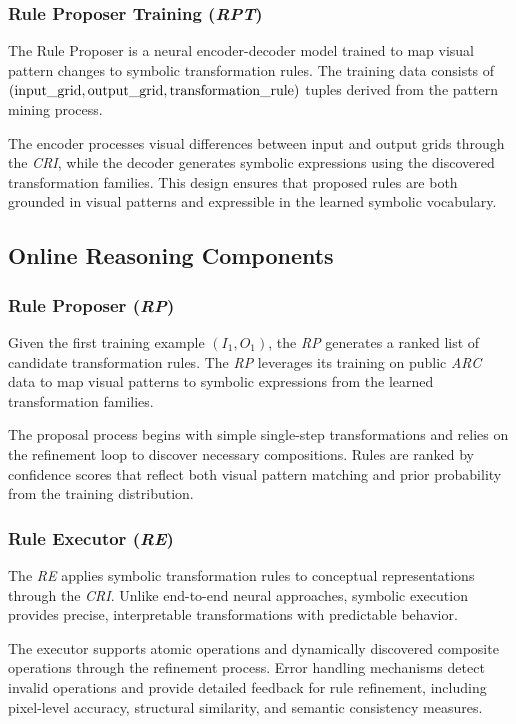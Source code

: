\documentclass[12pt]{article}
\newcommand{\arc}{\textit{ARC}}
\newcommand{\rpt}{\textit{RPT}}
\newcommand{\rp}{\textit{RP}}
\newcommand{\re}{\textit{RE}}
\newcommand{\cri}{\textit{CRI}}
\begin{document}
\subsubsection{Rule Proposer Training (\rpt{})}

The Rule Proposer is a neural encoder-decoder model trained to map visual pattern changes to symbolic transformation rules. The training data consists of $(\text{input\_grid}, \text{output\_grid},\\ \text{transformation\_rule})$ tuples derived from the pattern mining process.

The encoder processes visual differences between input and output grids through the \cri{}, while the decoder generates symbolic expressions using the discovered transformation families. This design ensures that proposed rules are both grounded in visual patterns and expressible in the learned symbolic vocabulary.

\subsection{Online Reasoning Components}

\subsubsection{Rule Proposer (\rp{})}

Given the first training example $(I_1, O_1)$, the \rp{} generates a ranked list of candidate transformation rules. The \rp{} leverages its training on public \arc{} data to map visual patterns to symbolic expressions from the learned transformation families.

The proposal process begins with simple single-step transformations and relies on the refinement loop to discover necessary compositions. Rules are ranked by confidence scores that reflect both visual pattern matching and prior probability from the training distribution.

\subsubsection{Rule Executor (\re{})}

The \re{} applies symbolic transformation rules to conceptual representations through the \cri{}. Unlike end-to-end neural approaches, symbolic execution provides precise, interpretable transformations with predictable behavior.

The executor supports atomic operations and dynamically discovered composite operations through the refinement process. Error handling mechanisms detect invalid operations and provide detailed feedback for rule refinement, including pixel-level accuracy, structural similarity, and semantic consistency measures.
\end{document}

